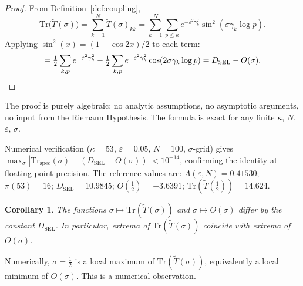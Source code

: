 \documentclass[11pt]{article}
\newtheorem{corollary}[theorem]{Corollary}
\newcommand{\Tt}{\widetilde{T}}
\newcommand{\DSEL}{D_{\mathrm{SEL}}}
\begin{document}
\begin{proof}
From Definition~\ref{def:coupling},
\[
\mathrm{Tr}\bigl(\Tt(\sigma)\bigr)
  = \sum_{k=1}^N \Tt(\sigma)_{kk}
  = \sum_{k=1}^N\sum_{p\leq\kappa}
    e^{-\varepsilon^2\gamma_k^2}\sin^2(\sigma\gamma_k\log p).
\]
Applying $\sin^2(x)=(1-\cos 2x)/2$ to each term:
\[
= \tfrac{1}{2}\sum_{k,p} e^{-\varepsilon^2\gamma_k^2}
  - \tfrac{1}{2}\sum_{k,p} e^{-\varepsilon^2\gamma_k^2}\cos(2\sigma\gamma_k\log p)
  = \DSEL - O(\sigma). \qedhere
\]
\end{proof}

The proof is purely algebraic: no analytic assumptions, no asymptotic
arguments, no input from the Riemann Hypothesis.
The formula is exact for any finite $\kappa$, $N$, $\varepsilon$, $\sigma$.

Numerical verification ($\kappa=53$, $\varepsilon=0.05$, $N=100$,
$\sigma$-grid) gives
$\max_\sigma|\mathrm{Tr}_{\mathrm{spec}}(\sigma)-(\DSEL-O(\sigma))|<10^{-14}$,
confirming the identity at floating-point precision.
The reference values are:
$A(\varepsilon,N)=0.41530$; $\pi(53)=16$;
$\DSEL = 10.9845$; $O(\tfrac{1}{2})=-3.6391$;
$\mathrm{Tr}(\Tt(\tfrac{1}{2}))=14.624$.

\begin{corollary}
\label{cor:extrema}
The functions $\sigma\mapsto\mathrm{Tr}(\Tt(\sigma))$ and
$\sigma\mapsto O(\sigma)$ differ by the constant $\DSEL$.
In particular, extrema of $\mathrm{Tr}(\Tt(\sigma))$ coincide
with extrema of $O(\sigma)$.
\end{corollary}

Numerically, $\sigma=\tfrac{1}{2}$ is a local maximum of
$\mathrm{Tr}(\Tt(\sigma))$, equivalently a local minimum of $O(\sigma)$.
This is a numerical observation.
\end{document}
